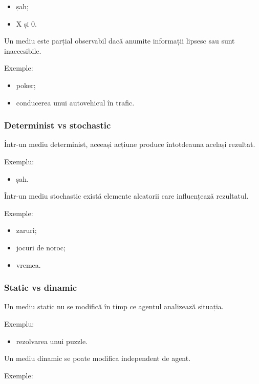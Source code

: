 \documentclass[12pt,a4paper]{article}
\begin{document}
\begin{itemize}
\item șah;
\item X și 0.
\end{itemize}

Un mediu este parțial observabil dacă anumite informații lipsesc sau sunt inaccesibile.

Exemple:

\begin{itemize}
\item poker;
\item conducerea unui autovehicul în trafic.
\end{itemize}

\subsubsection{Determinist vs stochastic}

Într-un mediu determinist, aceeași acțiune produce întotdeauna același rezultat.

Exemplu:

\begin{itemize}
\item șah.
\end{itemize}

Într-un mediu stochastic există elemente aleatorii care influențează rezultatul.

Exemple:

\begin{itemize}
\item zaruri;
\item jocuri de noroc;
\item vremea.
\end{itemize}

\subsubsection{Static vs dinamic}

Un mediu static nu se modifică în timp ce agentul analizează situația.

Exemplu:

\begin{itemize}
\item rezolvarea unui puzzle.
\end{itemize}

Un mediu dinamic se poate modifica independent de agent.

Exemple:
\end{document}
